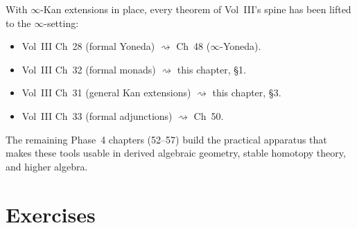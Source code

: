 \begin{remark}
With $\infty$-Kan extensions in place, every theorem of Vol~III's spine
has been lifted to the $\infty$-setting:
\begin{itemize}
  \item Vol~III Ch~28 (formal Yoneda) $\rightsquigarrow$ Ch~48 ($\infty$-Yoneda).
  \item Vol~III Ch~32 (formal monads) $\rightsquigarrow$ this chapter, §1.
  \item Vol~III Ch~31 (general Kan extensions) $\rightsquigarrow$ this chapter, §3.
  \item Vol~III Ch~33 (formal adjunctions) $\rightsquigarrow$ Ch~50.
\end{itemize}
The remaining Phase~4 chapters (52--57) build the practical apparatus
that makes these tools usable in derived algebraic geometry, stable
homotopy theory, and higher algebra.
\end{remark}


\section{Exercises}
\label{sec:monads-kan-exercises}

